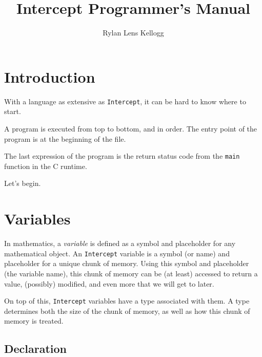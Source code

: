 \documentclass[12pt]{report}
\title  {Intercept Programmer's Manual}
\author {Rylan Lens Kellogg}
\begin{document}
\pagestyle{fancy}
\renewcommand{\chaptermark}[1]{\markboth{#1}{#1}}
\fancyhf{}
\fancyhead[C]{\leftmark}
\fancyfoot[C]{\thepage}

\hypersetup{pageanchor=false}
\begin{titlepage}
  \maketitle
\end{titlepage}

\chapter{Introduction}
\label{sec:intro}

With a language as extensive as \verb|Intercept|, it can be hard to know where to start.

A program is executed from top to bottom, and in order. The entry point of the program is at the beginning of the file.

The last expression of the program is the return status code from the \verb|main| function in the C runtime.

Let's begin.

\chapter{Variables}
\label{chpt:vars}

In mathematics, a \emph{variable} is defined as a symbol and placeholder for any mathematical object. An \verb|Intercept| variable is a symbol (or name) and placeholder for a unique chunk of memory. Using this symbol and placeholder (the variable name), this chunk of memory can be (at least) accessed to return a value, (possibly) modified, and even more that we will get to later.

On top of this, \verb|Intercept| variables have a type associated with them. A type determines both the size of the chunk of memory, as well as how this chunk of memory is treated.

\section*{Declaration}
\label{subsec:variables-declaration}
\end{document}
